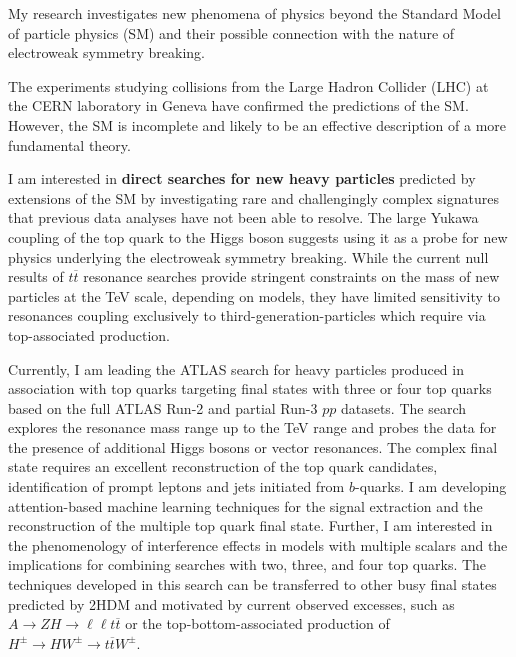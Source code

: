 \documentclass{article}
\begin{document}
\raisebox{.5cm}

My research investigates new phenomena of physics beyond the Standard Model of particle physics (SM) and their possible connection with the nature of electroweak symmetry breaking.

The experiments studying collisions from the Large Hadron Collider (LHC) at the CERN laboratory in Geneva have confirmed the predictions of the SM. However, the SM is incomplete and likely to be an effective description of a more fundamental theory.
\bigskip

I am interested in \textbf{direct searches for new heavy particles} predicted by extensions of the SM by investigating rare and challengingly complex signatures that previous data analyses have not been able to resolve.
The large Yukawa coupling of the top quark to the Higgs boson suggests using it as a probe for new physics underlying the electroweak symmetry breaking.
While the current null results of \(t\overline{t}\) resonance searches provide stringent constraints on the mass of new particles at the TeV scale, depending on models, they have limited sensitivity to resonances coupling exclusively to third-generation-particles which require via top-associated production.

Currently, I am leading the ATLAS search for heavy particles produced in association with top quarks targeting final states with three or four top quarks based on the full ATLAS Run-2 and partial Run-3 \(pp\) datasets. The search explores the resonance mass range up to the TeV range and probes the data for the presence of additional Higgs bosons or vector resonances.
The complex final state requires an excellent reconstruction of the top quark candidates, identification of prompt leptons and jets initiated from \(b\)-quarks. I am developing attention-based machine learning techniques for the signal extraction and the reconstruction of the multiple top quark final state. Further, I am interested in the phenomenology of interference effects in models with multiple scalars and the implications for combining searches with two, three, and four top quarks.
The techniques developed in this search can be transferred to other busy final states predicted by 2HDM and motivated by current observed excesses, such as \(A \rightarrow ZH \rightarrow \ell \ell t \overline{t}\) or the top-bottom-associated production of \(H^{\pm} \rightarrow H W^{\pm} \rightarrow t \overline{t} W^{\pm}\).
\end{document}
